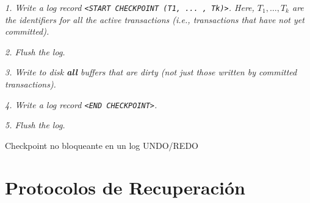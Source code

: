 \documentclass[a4paper, twoside]{article}
\begin{document}
\begin{algorithm}[H]
	\emph{1. Write a log record \texttt{<START CHECKPOINT (T1, ... , Tk)>}. Here, $T_{1}, \ldots, T_{k}$ are the identifiers for all the active transactions (i.e., transactions that have not yet committed).}

	\emph{2. Flush the log.}

	\emph{3. Write to disk \textbf{all} buffers that are dirty (not just those written by committed transactions).}

	\emph{4. Write a log record \texttt{<END CHECKPOINT>}.}

	\emph{5. Flush the log.}
	\caption{Checkpoint no bloqueante en un log UNDO/REDO}
\end{algorithm}

\section{Protocolos de Recuperación}
\end{document}
